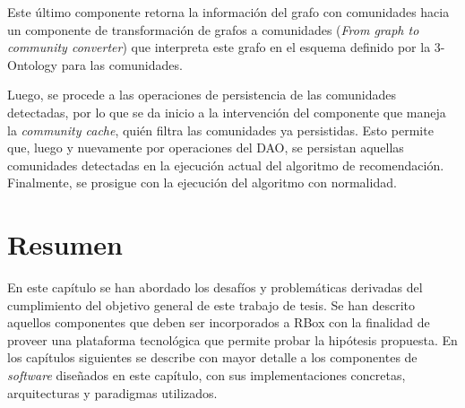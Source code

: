 Este último componente retorna la información del grafo con comunidades hacia un componente de transformación de grafos a comunidades (\textit{From graph to community converter}) que interpreta este grafo en el esquema definido por la 3-Ontology para las comunidades.

Luego, se procede a las operaciones de persistencia de las comunidades detectadas, por lo que se da inicio a la intervención del componente que maneja la \textit{community \textit{cache}}, quién filtra las comunidades ya persistidas. Esto permite que, luego y nuevamente por operaciones del DAO, se persistan aquellas comunidades detectadas en la ejecución actual del algoritmo de recomendación. Finalmente, se prosigue con la ejecución del algoritmo con normalidad.

\section{Resumen}

En este capítulo se han abordado los desafíos y problemáticas derivadas del cumplimiento del objetivo general de este trabajo de tesis. Se  han descrito aquellos componentes que deben ser incorporados a RBox con la finalidad de proveer una plataforma tecnológica que permite probar la hipótesis propuesta. En los capítulos siguientes se describe con mayor detalle a los componentes de \textit{software} diseñados en este capítulo, con sus implementaciones concretas, arquitecturas y paradigmas utilizados.
























